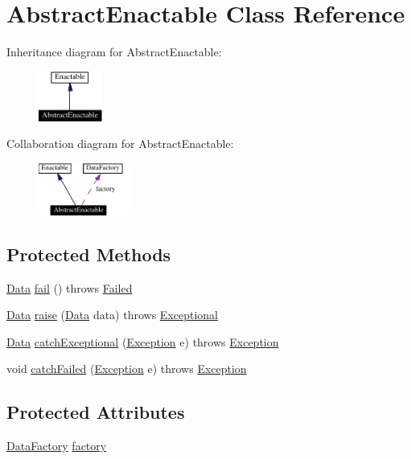 \hypertarget{classAbstractEnactable}{
\section{Abstract\-Enactable  Class Reference}
\label{classAbstractEnactable}
}
Inheritance diagram for Abstract\-Enactable:\begin{figure}[H]
\begin{center}
\leavevmode
\includegraphics[width=59pt]{classAbstractEnactable__inherit__graph}
\end{center}
\end{figure}
Collaboration diagram for Abstract\-Enactable:\begin{figure}[H]
\begin{center}
\leavevmode
\includegraphics[width=85pt]{classAbstractEnactable__coll__graph}
\end{center}
\end{figure}
\subsection*{Protected Methods}
\begin{CompactItemize}
\item 
\hyperlink{interfaceData}{Data} \hyperlink{classAbstractEnactable_b0}{fail} () throws \hyperlink{classFailed}{Failed}
\item 
\hyperlink{interfaceData}{Data} \hyperlink{classAbstractEnactable_b1}{raise} (\hyperlink{interfaceData}{Data} data) throws \hyperlink{classExceptional}{Exceptional}
\item 
\hyperlink{interfaceData}{Data} \hyperlink{classAbstractEnactable_b2}{catch\-Exceptional} (\hyperlink{classException}{Exception} e) throws \hyperlink{classException}{Exception}
\item 
void \hyperlink{classAbstractEnactable_b3}{catch\-Failed} (\hyperlink{classException}{Exception} e) throws \hyperlink{classException}{Exception}
\end{CompactItemize}
\subsection*{Protected Attributes}
\begin{CompactItemize}
\item 
\hyperlink{interfaceDataFactory}{Data\-Factory} \hyperlink{classAbstractEnactable_n0}{factory}
\end{CompactItemize}


